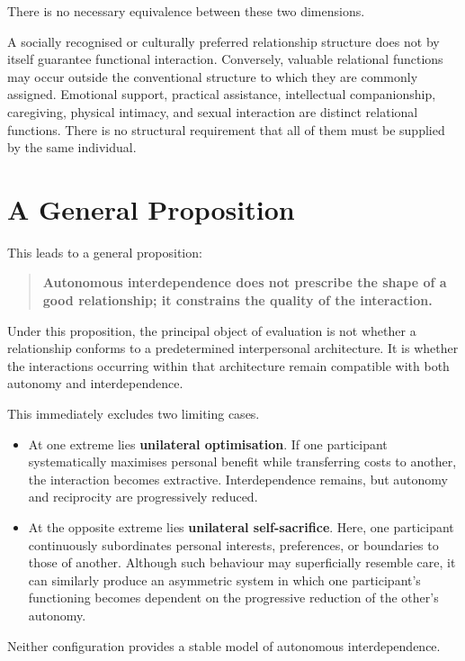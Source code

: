 \documentclass[11pt, a4paper]{article}
\begin{document}
There is no necessary equivalence between these two dimensions.

A socially recognised or culturally preferred relationship structure does not by itself guarantee functional interaction. Conversely, valuable relational functions may occur outside the conventional structure to which they are commonly assigned. Emotional support, practical assistance, intellectual companionship, caregiving, physical intimacy, and sexual interaction are distinct relational functions. There is no structural requirement that all of them must be supplied by the same individual.

\section*{A General Proposition}
This leads to a general proposition:

\begin{quote}
    \textbf{Autonomous interdependence does not prescribe the shape of a good relationship; it constrains the quality of the interaction.}
\end{quote}

Under this proposition, the principal object of evaluation is not whether a relationship conforms to a predetermined interpersonal architecture. It is whether the interactions occurring within that architecture remain compatible with both autonomy and interdependence.

This immediately excludes two limiting cases.

\begin{itemize}[leftmargin=*]
    \item At one extreme lies \textbf{unilateral optimisation}. If one participant systematically maximises personal benefit while transferring costs to another, the interaction becomes extractive. Interdependence remains, but autonomy and reciprocity are progressively reduced.
    \item At the opposite extreme lies \textbf{unilateral self-sacrifice}. Here, one participant continuously subordinates personal interests, preferences, or boundaries to those of another. Although such behaviour may superficially resemble care, it can similarly produce an asymmetric system in which one participant's functioning becomes dependent on the progressive reduction of the other's autonomy.
\end{itemize}

Neither configuration provides a stable model of autonomous interdependence.
\end{document}
